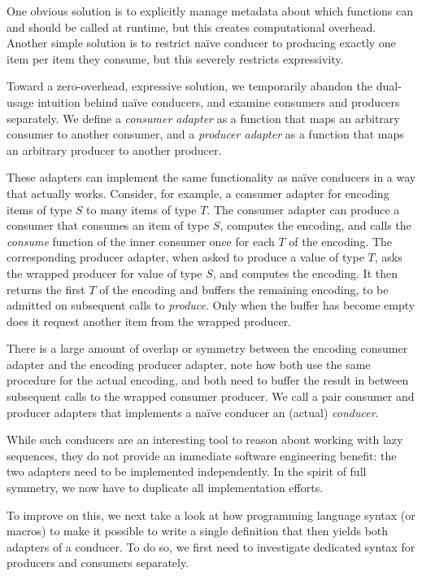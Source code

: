 \documentclass[sigplan,screen,10pt,anonymous,review]{acmart}
\begin{document}
One obvious solution is to explicitly manage metadata about which functions can and should be called at runtime, but this creates computational overhead. Another simple solution is to restrict naïve conducer to producing exactly one item per item they consume, but this severely restricts expressivity.

Toward a zero-overhead, expressive solution, we temporarily abandon the dual-usage intuition behind naïve conducers, and examine consumers and producers separately. We define a \textit{consumer adapter} as a function that maps an arbitrary consumer to another consumer, and a \textit{producer adapter} as a function that maps an arbitrary producer to another producer.

These adapters can implement the same functionality as naïve conducers in a way that actually works. Consider, for example, a consumer adapter for encoding items of type $S$ to many items of type $T$. The consumer adapter can produce a consumer that consumes an item of type $S$, computes the encoding, and calls the \textit{consume} function of the inner consumer once for each $T$ of the encoding. The corresponding producer adapter, when asked to produce a value of type $T$, asks the wrapped producer for value of type $S$, and computes the encoding. It then returns the first $T$ of the encoding and buffers the remaining encoding, to be admitted on subsequent calls to \textit{produce}. Only when the buffer has become empty does it request another item from the wrapped producer.

There is a large amount of overlap or symmetry between the encoding consumer adapter and the encoding producer adapter, note how both use the same procedure for the actual encoding, and both need to buffer the result in between subsequent calls to the wrapped consumer producer. We call a pair consumer and producer adapters that implements a naïve conducer an (actual) \textit{conducer}.

While such conducers are an interesting tool to reason about working with lazy sequences, they do not provide an immediate software engineering benefit: the two adapters need to be implemented independently. In the spirit of full symmetry, we now have to duplicate all implementation efforts.

To improve on this, we next take a look at how programming language syntax (or macros) to make it possible to write a single definition that then yields both adapters of a conducer. To do so, we first need to investigate dedicated syntax for producers and consumers separately.
\end{document}
